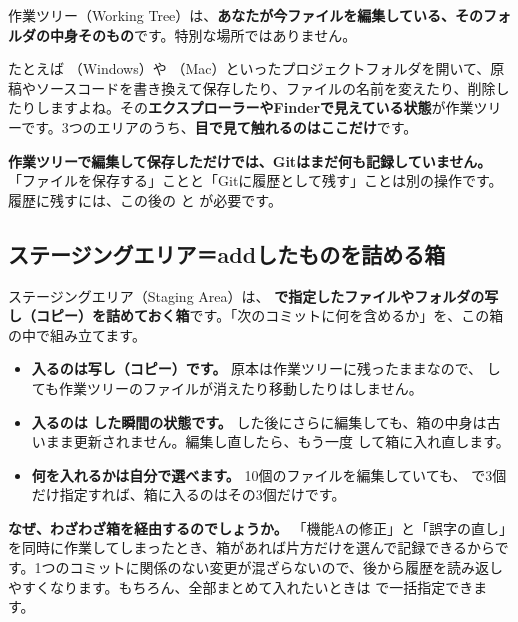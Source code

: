 作業ツリー（Working Tree）は、\textbf{あなたが今ファイルを編集している、そのフォルダの中身そのもの}です。特別な場所ではありません。

たとえば （Windows）や （Mac）といったプロジェクトフォルダを開いて、原稿やソースコードを書き換えて保存したり、ファイルの名前を変えたり、削除したりしますよね。その\textbf{エクスプローラーやFinderで見えている状態}が作業ツリーです。3つのエリアのうち、\textbf{目で見て触れるのはここだけ}です。

\begin{warnbox}
\textbf{作業ツリーで編集して保存しただけでは、Gitはまだ何も記録していません。} 「ファイルを保存する」ことと「Gitに履歴として残す」ことは別の操作です。履歴に残すには、この後の  と  が必要です。
\end{warnbox}

\subsection{ステージングエリア＝addしたものを詰める箱}

ステージングエリア（Staging Area）は、\textbf{ で指定したファイルやフォルダの写し（コピー）を詰めておく箱}です。「次のコミットに何を含めるか」を、この箱の中で組み立てます。

\begin{itemize}[leftmargin=1.4em]
  \item \textbf{入るのは写し（コピー）です。} 原本は作業ツリーに残ったままなので、 しても作業ツリーのファイルが消えたり移動したりはしません。
  \item \textbf{入るのは  した瞬間の状態です。}  した後にさらに編集しても、箱の中身は古いまま更新されません。編集し直したら、もう一度  して箱に入れ直します。
  \item \textbf{何を入れるかは自分で選べます。} 10個のファイルを編集していても、 で3個だけ指定すれば、箱に入るのはその3個だけです。
\end{itemize}

\textbf{なぜ、わざわざ箱を経由するのでしょうか。} 「機能Aの修正」と「誤字の直し」を同時に作業してしまったとき、箱があれば片方だけを選んで記録できるからです。1つのコミットに関係のない変更が混ざらないので、後から履歴を読み返しやすくなります。もちろん、全部まとめて入れたいときは  で一括指定できます。

